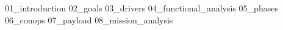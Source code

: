 {01_introduction}
{02_goals}
{03_drivers}
{04_functional_analysis}
{05_phases}
{06_conops}
{07_payload}
{08_mission_analysis}